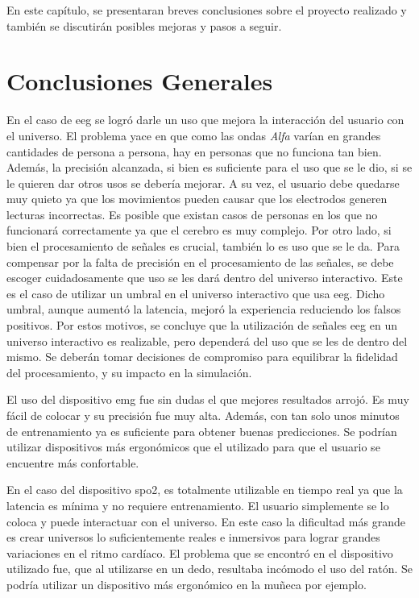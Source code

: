 En este capítulo, se presentaran breves conclusiones sobre el proyecto realizado y también se discutirán posibles mejoras y pasos a seguir.

\section{Conclusiones Generales}

En el caso de \acrshort{eeg} se logró darle un uso que mejora la interacción del usuario con el universo. El problema yace en que como las ondas \emph{Alfa} varían en grandes cantidades de persona a persona, hay en personas que no funciona tan bien. Además, la precisión alcanzada, si bien es suficiente para el uso que se le dio, si se le quieren dar otros usos se debería mejorar. A su vez, el usuario debe quedarse muy quieto ya que los movimientos pueden causar que los electrodos generen lecturas incorrectas. Es posible que existan casos de personas en los que no funcionará correctamente ya que el cerebro es muy complejo. Por otro lado, si bien el procesamiento de señales es crucial, también lo es uso que se le da. Para compensar por la falta de precisión en el procesamiento de las señales, se debe escoger cuidadosamente que uso se les dará dentro del universo interactivo. Este es el caso de utilizar un umbral en el universo interactivo que usa \acrshort{eeg}. Dicho umbral, aunque aumentó la latencia, mejoró la experiencia reduciendo los falsos positivos. Por estos motivos, se concluye que la utilización de señales \acrshort{eeg} en un universo interactivo es realizable, pero dependerá del uso que se les de dentro del mismo. Se deberán tomar decisiones de compromiso para equilibrar la fidelidad del procesamiento, y su impacto en la simulación.

El uso del dispositivo \acrshort{emg} fue sin dudas el que mejores resultados arrojó. Es muy fácil de colocar y su precisión fue muy alta. Además, con tan solo unos minutos de entrenamiento ya es suficiente para obtener buenas predicciones. Se podrían utilizar dispositivos más ergonómicos que el utilizado para que el usuario se encuentre más confortable.

En el caso del dispositivo \acrshort{spo2}, es totalmente utilizable en tiempo real ya que la latencia es mínima y no requiere entrenamiento. El usuario simplemente se lo coloca y puede interactuar con el universo. En este caso la dificultad más grande es crear universos lo suficientemente reales e inmersivos para lograr grandes variaciones en el ritmo cardíaco. El problema que se encontró en el dispositivo utilizado fue, que al utilizarse en un dedo, resultaba incómodo el uso del ratón. Se podría utilizar un dispositivo más ergonómico en la muñeca por ejemplo.

